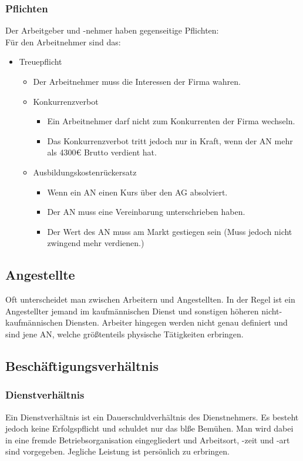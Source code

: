 \documentclass{article}
\begin{document}
	\subsubsection{Pflichten}
	Der Arbeitgeber und -nehmer haben gegenseitige Pflichten: \\
	Für den Arbeitnehmer sind das:
	\begin{itemize}
		\item{Treuepflicht}
		\begin{itemize}
			\item{Der Arbeitnehmer muss die Interessen der Firma wahren.}
			\item{Konkurrenzverbot}
			\begin{itemize}
			\item{Ein Arbeitnehmer darf nicht zum Konkurrenten der Firma wechseln.}
			\item{Das Konkurrenzverbot tritt jedoch nur in Kraft, wenn der AN mehr als 4300€ Brutto verdient hat.}
			\end{itemize}
			\item{Ausbildungskostenrückersatz}
			\begin{itemize}
				\item{Wenn ein AN einen Kurs über den AG absolviert.}
				\item{Der AN muss eine Vereinbarung unterschrieben haben.}
				\item{Der Wert des AN muss am Markt gestiegen sein (Muss jedoch nicht zwingend mehr verdienen.)}
			\end{itemize}
		\end{itemize}
	\end{itemize}
	\subsection{Angestellte}
	Oft unterscheidet man zwischen Arbeitern und Angestellten. In der Regel ist ein Angestellter jemand im kaufmännischen Dienst und sonstigen höheren nicht-kaufmännischen Diensten. Arbeiter hingegen werden nicht genau definiert und sind jene AN, welche größtenteils physische Tätigkeiten erbringen.
	\subsection{Beschäftigungsverhältnis}
	\subsubsection{Dienstverhältnis}
	Ein Dienstverhältnis ist ein Dauerschuldverhältnis des Dienstnehmers. Es besteht jedoch keine Erfolgspflicht und schuldet nur das blße Bemühen. Man wird dabei in eine fremde Betriebsorganisation eingegliedert und Arbeitsort, -zeit und -art sind vorgegeben. Jegliche Leistung ist persönlich zu erbringen.
\end{document}
